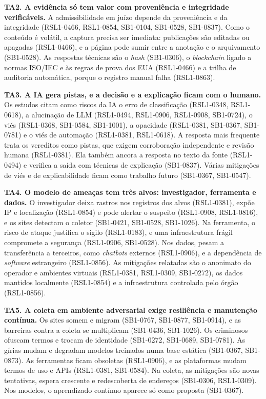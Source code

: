\textbf{TA2. A evidência só tem valor com proveniência e integridade
verificáveis.} A admissibilidade em juízo depende da proveniência e da
integridade (RSL1-0466, RSL1-0854, SB1-0104, SB1-0528, SB1-0837). Como o
conteúdo é volátil, a captura precisa ser imediata: publicações são editadas
ou apagadas (RSL1-0466), e a página pode sumir entre a anotação e o
arquivamento (SB1-0528). As respostas técnicas são o \textit{hash}
(SB1-0306), o \textit{blockchain} ligado a normas ISO/IEC e às regras de
prova dos EUA (RSL1-0466) e a trilha de auditoria automática, porque o
registro manual falha (RSL1-0863).

\textbf{TA3. A IA gera pistas, e a decisão e a explicação ficam com o
humano.} Os estudos citam como riscos da IA o erro de classificação
(RSL1-0348, RSL1-0618), a alucinação de LLM (RSL1-0494, RSL1-0906,
RSL1-0908, SB1-0724), o viés (RSL1-0368, SB1-0584, SB1-1001), a opacidade
(RSL1-0381, SB1-0367, SB1-0781) e o viés de automação (RSL1-0381,
RSL1-0618). A resposta mais frequente trata os vereditos como pistas, que
exigem corroboração independente e revisão humana (RSL1-0381). Ela também
ancora a resposta no texto da fonte (RSL1-0494) e verifica a saída com
técnicas de explicação (SB1-0837). Várias mitigações de viés e de
explicabilidade ficam como trabalho futuro (SB1-0367, SB1-0547).

\textbf{TA4. O modelo de ameaças tem três alvos: investigador, ferramenta e
dados.} O investigador deixa rastros nos registros dos alvos (RSL1-0381),
expõe IP e localização (RSL1-0854) e pode alertar o suspeito (RSL1-0908,
RSL1-0816), e os sites detectam o coletor (SB1-0421, SB1-0528, SB1-1026). Na
ferramenta, o risco de ataque justifica o sigilo (RSL1-0183), e uma
infraestrutura frágil compromete a segurança (RSL1-0906, SB1-0528). Nos
dados, pesam a transferência a terceiros, como \textit{chatbots} externos
(RSL1-0906), e a dependência de \textit{software} estrangeiro (RSL1-0856).
As mitigações relatadas são o anonimato do operador e ambientes virtuais
(RSL1-0381, RSL1-0309, SB1-0272), os dados mantidos localmente (RSL1-0854)
e a infraestrutura controlada pelo órgão (RSL1-0856).

\textbf{TA5. A coleta em ambiente adversarial exige resiliência e manutenção
contínua.} Os sites somem e migram (SB1-0767, SB1-0877, SB1-0914), e as
barreiras contra a coleta se multiplicam (SB1-0436, SB1-1026). Os criminosos
ofuscam termos e trocam de identidade (SB1-0272, SB1-0689, SB1-0781). As
gírias mudam e degradam modelos treinados numa base estática (SB1-0367,
SB1-0873). As ferramentas ficam obsoletas (RSL1-0906), e as plataformas
mudam termos de uso e APIs (RSL1-0381, SB1-0584). Na coleta, as mitigações
são novas tentativas, espera crescente e redescoberta de endereços
(SB1-0306, RSL1-0309). Nos modelos, o aprendizado contínuo aparece só como
proposta (SB1-0367).

